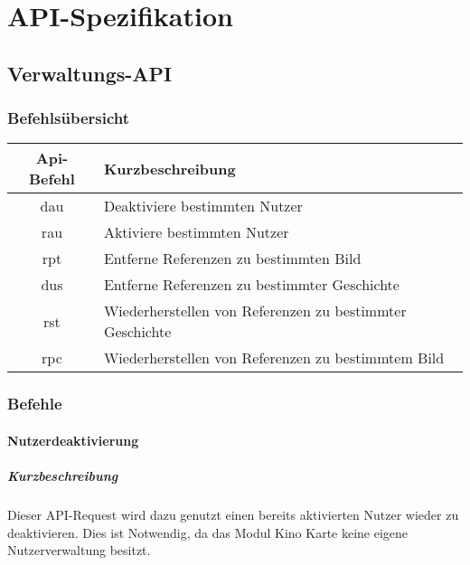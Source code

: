 \chapter{API-Spezifikation}\label{rapi}
\section{Verwaltungs-API}
\subsection{Befehlsübersicht}
\begin{longtable}[H]{|c|p{12cm}|}
		\hline
		\textbf{Api-Befehl} & \textbf{Kurzbeschreibung}              \\ \hline
		dau                 & Deaktiviere bestimmten Nutzer          \\ \hline
		rau                 & Aktiviere bestimmten Nutzer            \\ \hline
		rpt                 & Entferne Referenzen zu bestimmten Bild \\ \hline
		dus                 & Entferne Referenzen zu bestimmter Geschichte \\ \hline
		rst                 & Wiederherstellen von Referenzen zu bestimmter Geschichte \\ \hline
		rpc                 & Wiederherstellen von Referenzen zu bestimmtem Bild \\ \hline
\end{longtable}
\newpage
\subsection{Befehle}
\subsubsection{Nutzerdeaktivierung}
\paragraph{Kurzbeschreibung}Dieser API-Request wird dazu genutzt einen bereits aktivierten Nutzer wieder zu deaktivieren. Dies ist Notwendig, da das Modul {\glqq Kino Karte\grqq} keine eigene Nutzerverwaltung besitzt.
